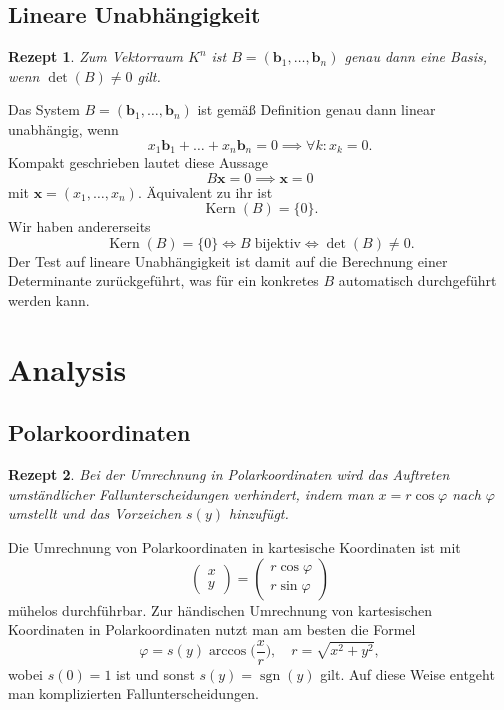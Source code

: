 \documentclass[a4paper,10pt,fleqn,twocolumn,twoside,dvipdfmx]{scrartcl}
\theoremstyle{rmbox}
\newtheorem{Rezept}{Rezept}[section]
\newcommand{\bv}[1]{\mathbf{#1}}
\newcommand{\sgn}{\operatorname{sgn}}
\begin{document}
\subsection{Lineare Unabhängigkeit}
\begin{Rezept}
Zum Vektorraum $K^n$ ist $B=(\bv b_1,\ldots,\bv b_n)$ genau dann eine
Basis, wenn $\det(B)\ne 0$ gilt.
\end{Rezept}
Das System $B=(\bv b_1,\ldots,\bv b_n)$ ist gemäß Definition genau
dann linear unabhängig, wenn
\[x_1 \bv b_1+\ldots + x_n\bv b_n = 0\implies \forall k\colon x_k = 0.\]
Kompakt geschrieben lautet diese Aussage
\[B\bv x = 0\implies \bv x=0\]
mit $\bv x = (x_1,\ldots,x_n)$. Äquivalent zu ihr ist
\[\operatorname{Kern}(B) = \{0\}.\]
Wir haben andererseits
\[\operatorname{Kern}(B) = \{0\}\iff B\;\text{bijektiv}\iff \det(B)\ne 0.\]
Der Test auf lineare Unabhängigkeit ist damit auf die Berechnung
einer Determinante zurückgeführt, was für ein konkretes $B$
automatisch durchgeführt werden kann.

\newpage
\section{Analysis}

\subsection{Polarkoordinaten}

\begin{Rezept}
Bei der Umrechnung in Polarkoordinaten wird das Auftreten
umständlicher Fallunterscheidungen verhindert,
indem man $x=r\cos\varphi$ nach $\varphi$ umstellt
und das Vorzeichen $s(y)$ hinzufügt.
\end{Rezept}

\noindent
Die Umrechnung von Polarkoordinaten in kartesische Koordinaten
ist mit
\[\begin{pmatrix}x\\ y\end{pmatrix}
= \begin{pmatrix}r\cos\varphi\\ r\sin\varphi\end{pmatrix}\]
mühelos durchführbar. Zur händischen Umrechnung von kartesischen
Koordinaten in Polarkoordinaten nutzt man am besten die Formel
\[\varphi = s(y)\arccos\Big(\frac{x}{r}\Big),\quad r=\sqrt{x^2+y^2},\]
wobei $s(0)=1$ ist und sonst $s(y)=\sgn(y)$ gilt. Auf diese
Weise entgeht man komplizierten Fallunterscheidungen.
\end{document}
